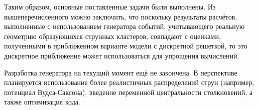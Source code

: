 Таким образом, основные поставленные задачи были выполнены. Из вышеперечисленного можно заключить, что поскольку результаты расчётов, выполненные с использованием генератора событий, учитывающего реальную геометрию образующихся струнных кластеров, совпадают с оценками, полученными в приближенном варианте модели с дискретной решеткой, то это дискретное приближение может использоваться для упрощения вычислений.

Разработка генератора на текущий момент ещё не закончена. В перспективе планируется использование более реалистичных распределений струн (например, потенциал Вудса-Саксона), введение переменной центральности столкновений, а также оптимизация кода.
